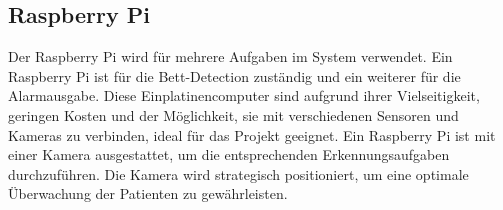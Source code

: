 
\subsection{Raspberry Pi}
Der Raspberry Pi wird für mehrere Aufgaben im System verwendet. Ein Raspberry Pi ist für die Bett-Detection zuständig und ein weiterer für die Alarmausgabe. Diese Einplatinencomputer sind aufgrund ihrer Vielseitigkeit, geringen Kosten und der Möglichkeit, sie mit verschiedenen Sensoren und Kameras zu verbinden, ideal für das Projekt geeignet. Ein Raspberry Pi ist mit einer Kamera ausgestattet, um die entsprechenden Erkennungsaufgaben durchzuführen. Die Kamera wird strategisch positioniert, um eine optimale Überwachung der Patienten zu gewährleisten.

